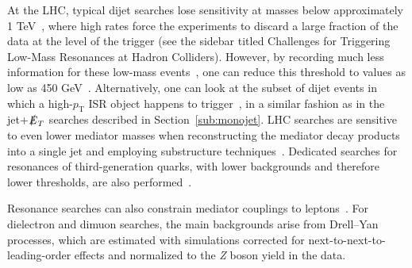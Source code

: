 \documentclass{ar-1col}
\newcommand{\pt}{\ensuremath{p_\mathrm{T}}\xspace}
\newcommand{\MET}{\ensuremath{\slashed{E}_T}\xspace}
\begin{document}
{At the LHC, typical dijet searches lose sensitivity at masses
below approximately 1 TeV~\cite{An:2012ue,Dobrescu:2013coa}, where high
rates force the experiments to discard a large fraction of the
data at the level of the trigger (see the sidebar titled Challenges for Triggering Low-Mass Resonances at Hadron Colliders). 
However, by recording much less
information for these low-mass
events~\cite{Khachatryan:2016ecr,Aaboud:2016leb}, 
one can reduce this threshold to values as low as 450
GeV~\cite{Sirunyan:2018xlo,Aaboud:2018fzt}.  
Alternatively, one can look at the subset of dijet events in which a
high-\pt{} ISR object happens to
trigger~\cite{ATLAS:2016bvn,Sirunyan:2017nvi}, in a similar fashion as in
the jet+\MET searches described in Section~\ref{sub:monojet}. 
LHC searches are sensitive to even lower mediator masses when
reconstructing the mediator decay products into a single jet and
employing substructure techniques~\cite{Sirunyan:2017nvi,Aaboud:2018zba}. 
Dedicated searches for resonances of third-generation
quarks, with lower backgrounds and therefore lower thresholds, are
also performed~\cite{Aaboud:2018tqo,CMS-PAS-HIG-16-025,Aaboud:2017hnm}.

Resonance searches can also constrain mediator couplings to 
leptons~\cite{Aaboud:2017buh,Khachatryan:2016zqb}. For dielectron
and dimuon searches, the main backgrounds arise from Drell--Yan
processes, which are estimated with simulations corrected for next-to-next-to-leading-order
effects and normalized to the \textit{Z} boson yield in the data.

}
\end{document}
